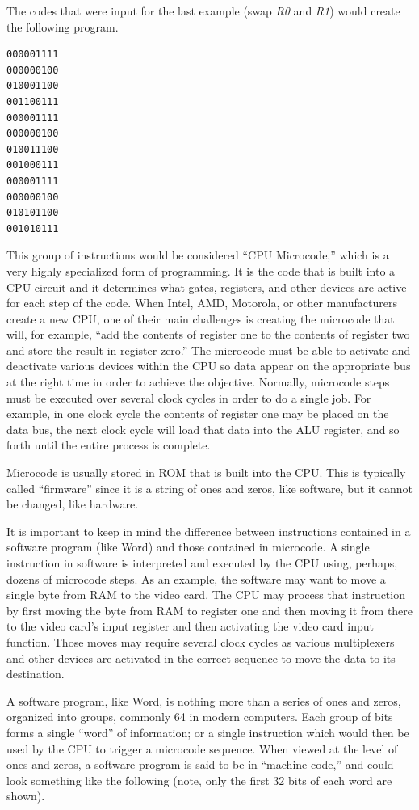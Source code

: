 The codes that were input for the last example (swap \textit{R0} and \textit{R1}) would create the following program.

\begin{Verbatim}[frame=lines,
xleftmargin=10mm,
xrightmargin=10mm]
000001111
000000100
010001100
001100111
000001111
000000100
010011100
001000111
000001111
000000100
010101100
001010111
\end{Verbatim}

This group of instructions would be considered ``CPU Microcode,'' which is a very highly specialized form of programming. It is the code that is built into a \ac{CPU} circuit and it determines what gates, registers, and other devices are active for each step of the code. When Intel, AMD, Motorola, or other manufacturers create a new \ac{CPU}, one of their main challenges is creating the microcode that will, for example, ``add the contents of register one to the contents of register two and store the result in register zero.'' The microcode must be able to activate and deactivate various devices within the \ac{CPU} so data appear on the appropriate bus at the right time in order to achieve the objective. Normally, microcode steps must be executed over several clock cycles in order to do a single job. For example, in one clock cycle the contents of register one may be placed on the data bus, the next clock cycle will load that data into the ALU register, and so forth until the entire process is complete.

Microcode is usually stored in \ac{ROM} that is built into the \ac{CPU}. This is typically called ``firmware'' since it is a string of ones and zeros, like software, but it cannot be changed, like hardware.

It is important to keep in mind the difference between instructions contained in a software program (like Word) and those contained in microcode. A single instruction in software is interpreted and executed by the \ac{CPU} using, perhaps, dozens of microcode steps. As an example, the software may want to move a single byte from \ac{RAM} to the video card. The \ac{CPU} may process that instruction by first moving the byte from \ac{RAM} to register one and then moving it from there to the video card's input register and then activating the video card input function. Those moves may require several clock cycles as various multiplexers and other devices are activated in the correct sequence to move the data to its destination. 

A software program, like Word, is nothing more than a series of ones and zeros, organized into groups, commonly 64 in modern computers. Each group of bits forms a single ``word'' of information; or a single instruction which would then be used by the \ac{CPU} to trigger a microcode sequence. When viewed at the level of ones and zeros, a software program is said to be in ``machine code,'' and could look something like the following (note, only the first 32 bits of each word are shown).

